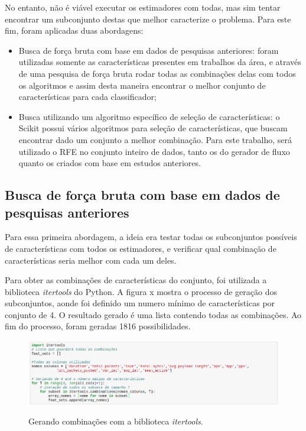 No entanto, não é viável executar os estimadores com todas, mas sim tentar encontrar um subconjunto destas que melhor caracterize o problema. Para este fim, foram aplicadas duas abordagens:

\begin{itemize}
    \item Busca de força bruta com base em dados de pesquisas anteriores: foram utilizadas somente as características presentes em trabalhos da área, e através de uma pesquisa de força bruta rodar todas as combinações delas com todos os algoritmos e assim desta maneira encontrar o melhor conjunto de características para cada classificador;

    \item Busca utilizando um algoritmo específico de seleção de características: o Scikit possui vários algoritmos para seleção de características, que buscam encontrar dado um conjunto a melhor combinação. Para este trabalho, será utilizado o RFE no conjunto inteiro de dados, tanto os do gerador de fluxo quanto os criados com base em estudos anteriores. 
\end{itemize}

\subsection{Busca de força bruta com base em dados de pesquisas anteriores}
\label{ss.dados-hist}

Para essa primeira abordagem, a ideia era testar todas os subconjuntos possíveis de características com todos os estimadores, e verificar qual combinação de características seria melhor com cada um deles.

Para obter as combinações de características do conjunto, foi utilizada a biblioteca \textit{itertools} do Python. A figura x mostra o processo de geração dos subconjuntos, aonde foi definido um numero mínimo de características por conjunto de 4. O resultado gerado é uma lista contendo todas as combinações. Ao fim do processo, foram geradas 1816 possibilidades.

\begin{figure}[h]
\caption{\small Gerando combinações com a biblioteca \textit{itertools}.}
\centering
\includegraphics[scale=0.40]{figs/exemplo-itertools.png}
\label{f.exemplo-itertools}
\end{figure}

